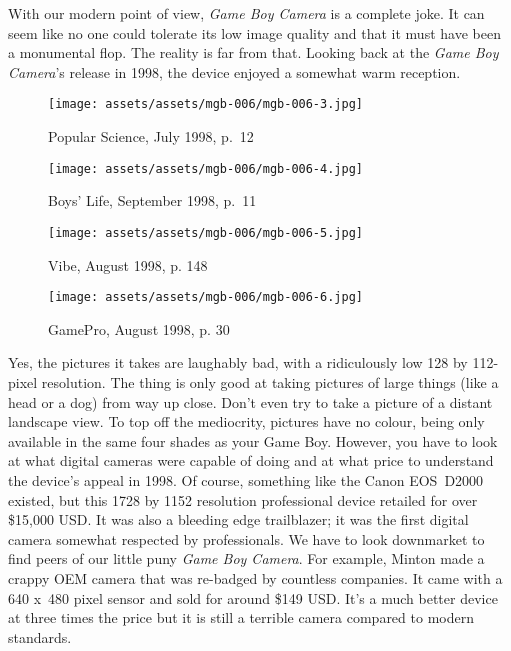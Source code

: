 \documentclass{book}
\begin{document}
With our modern point of view, \emph{Game Boy Camera} is a complete joke. It can seem like no one could tolerate its low image quality and that it must have been a monumental flop. The reality is far from that. Looking back at the \emph{Game Boy Camera}’s release in 1998, the device enjoyed a somewhat warm reception.

\begin{figure}[hbt]
\vskip 10pt
\centering \texttt{[image: assets/assets/mgb-006/mgb-006-3.jpg]}\par\pagetwodescription Popular Science, July 1998, p.~12
\vskip 6pt
\end{figure}
\begin{figure}[hbt]
\vskip 10pt
\centering \texttt{[image: assets/assets/mgb-006/mgb-006-4.jpg]}\par\pagetwodescription Boys’ Life, September 1998, p.~11
\vskip 6pt
\end{figure}
\begin{figure}[hbt]
\vskip 10pt
\centering \texttt{[image: assets/assets/mgb-006/mgb-006-5.jpg]}\par\pagetwodescription Vibe, August 1998, p. 148
\vskip 6pt
\end{figure}
\begin{figure}[hbt]
\vskip 10pt
\centering \texttt{[image: assets/assets/mgb-006/mgb-006-6.jpg]}\par\pagetwodescription GamePro, August 1998, p. 30
\vskip 6pt
\end{figure}

Yes, the pictures it takes are laughably bad, with a ridiculously low 128 by 112-pixel resolution. The thing is only good at taking pictures of large things (like a head or a dog) from way up close. Don’t even try to take a picture of a distant landscape view. To top off the mediocrity, pictures have no colour, being only available in the same four shades as your Game Boy. However, you have to look at what digital cameras were capable of doing and at what price to understand the device’s appeal in 1998. Of course, something like the Canon EOS~D2000 existed, but this 1728 by 1152 resolution professional device retailed for over \$15,000 USD. It was also a bleeding edge trailblazer; it was the first digital camera somewhat respected by professionals. We have to look downmarket to find peers of our little puny \emph{Game Boy Camera}. For example, Minton made a crappy OEM camera that was re-badged by countless companies. It came with a 640 x~480 pixel sensor and sold for around \$149 USD. It’s a much better device at three times the price but it is still a terrible camera compared to modern standards.
\end{document}
